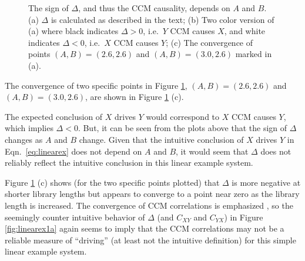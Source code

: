 \documentclass[twocolumn,aps,pre,groupedaddress]{revtex4-1}
\begin{document}
\begin{figure}[ht]
\begin{tabular}{l}
\end{tabular}
\caption{The sign of $\Delta$, and thus the CCM causality, depends on $A$ and $B$. (a) $\Delta$ is calculated as described in the text; (b) Two color version of (a) where black indicates $\Delta>0$, i.e.\ $Y$ CCM causes $X$, and white indicates $\Delta<0$, i.e.\ $X$ CCM causes $Y$; (c) The convergence of points $(A,B) = (2.6,2.6)$ and $(A,B)=(3.0,2.6)$ marked in (a).}
\label{fig:linearex1}
\end{figure}
The convergence of two specific points in Figure \ref{fig:linearex1}, $(A,B) = (2.6,2.6)$ and $(A,B)=(3.0,2.6)$, are shown in Figure \ref{fig:linearex1} (c).

The expected conclusion of $X$ drives $Y$ would correspond to  $X$ CCM causes $Y$, which implies $\Delta<0$.  But, it can be seen from the plots above that the sign of $\Delta$ changes as $A$ and $B$ change.  Given that the intuitive conclusion of $X$ drives $Y$ in Eqn.\ \ref{eq:linearex} does not depend on $A$ and $B$, it would seem that $\Delta$ does not reliably reflect the intuitive conclusion in this linear example system.  

Figure \ref{fig:linearex1} (c) shows (for the two specific points plotted) that $\Delta$ is more negative at shorter library lengths but appears to converge to a point near zero as the library length is increased.  The convergence of CCM correlations is emphasized \cite{Sugihara2012}, so the seemingly counter intuitive behavior of $\Delta$ (and $C_{XY}$ and $C_{YX}$) in Figure \ref{fig:linearex1a} again seems to imply that the CCM correlations may not be a reliable measure of ``driving'' (at least not the intuitive definition) for this simple linear example system.
\end{document}
